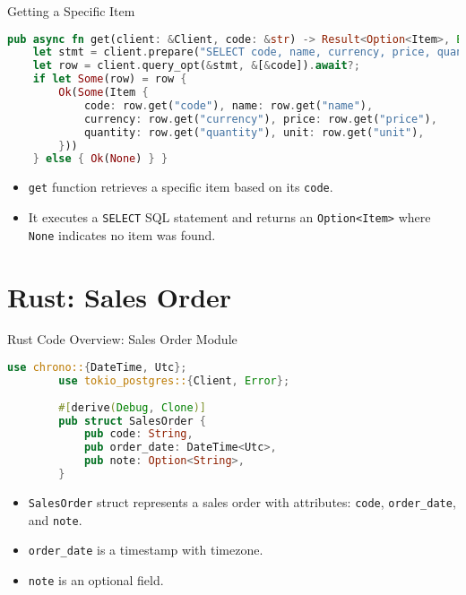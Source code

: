 \documentclass[aspectratio=169, table]{beamer}
\begin{document}
\begin{frame}[fragile]{Getting a Specific Item}
\vspace{15pt}
\begin{lstlisting}[language=Rust]
pub async fn get(client: &Client, code: &str) -> Result<Option<Item>, Error> {
	let stmt = client.prepare("SELECT code, name, currency, price, quantity, unit FROM item WHERE code = $1").await?;
	let row = client.query_opt(&stmt, &[&code]).await?;
	if let Some(row) = row {
		Ok(Some(Item {
			code: row.get("code"), name: row.get("name"),
			currency: row.get("currency"), price: row.get("price"),
			quantity: row.get("quantity"), unit: row.get("unit"),
		}))
	} else { Ok(None) } }
\end{lstlisting}

\begin{itemize}
\item \texttt{get} function retrieves a specific item based on its \texttt{code}.
\item It executes a \texttt{SELECT} SQL statement and returns an \texttt{Option<Item>} where \texttt{None} indicates no item was found.
\end{itemize}
\end{frame}

\section{Rust: Sales Order}
\begin{frame}[fragile]{Rust Code Overview: Sales Order Module}
	\begin{lstlisting}[language=Rust]
		use chrono::{DateTime, Utc};
		use tokio_postgres::{Client, Error};
		
		#[derive(Debug, Clone)]
		pub struct SalesOrder {
			pub code: String,
			pub order_date: DateTime<Utc>,
			pub note: Option<String>,
		}
	\end{lstlisting}
	
	\begin{itemize}
		\item \texttt{SalesOrder} struct represents a sales order with attributes: \texttt{code}, \texttt{order\_date}, and \texttt{note}.
		\item \texttt{order\_date} is a timestamp with timezone.
		\item \texttt{note} is an optional field.
	\end{itemize}
\end{frame}
\end{document}

